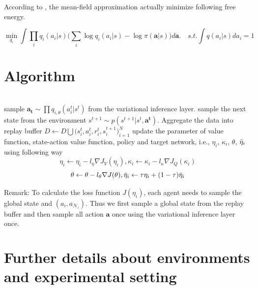 \documentclass[11pt,a4paper]{article}
\theoremstyle{definition}
\begin{document}
According to \cite{wainwright2008graphical}, the mean-field approximation actually minimize following free energy.


\begin{equation}
\min_{q_i}\int \prod_i q_i(a_i|s) \big( \sum_i \log q_i(a_i|s) - \log \pi(\mathbf{a}|s) \big) d\mathbf{a}.\quad s.t. \int q(a_i|s) da_i = 1
\end{equation}



\section{Algorithm}\label{section:algorithm}


\begin{algorithm}[h]
	\caption{variational policy propagation}\label{alg:IP}
	\begin{algorithmic}
		 \\
		\STATE sample $\mathbf{a_t}\sim \prod q_{i,\theta}(a_i^t|s^t)$ from the  variational inference  layer.
		sample the next state from the environment $s^{t+1}\sim p(s^{t+1}|s^t,\mathbf{a^t})$. Aggregate the data into replay buffer $D\leftarrow D \bigcup \big( s_i^t, a_i^t, r_i^t, s_i^{t+1} \big)_{i=1}^N$ 
		\ENDFOR
		\STATE{}
		update the parameter of value function, state-action value function, policy and target network, i.e.,  $\eta_i$, $\kappa_i$, $\theta$, $\Bar{\eta}_i$ using following way
		$$\eta_i\leftarrow\eta_i-l_\eta\nabla J_V(\eta_i),\kappa_i\leftarrow\kappa_i-l_\kappa\nabla J_Q(\kappa_i) $$
		$$\theta\leftarrow\theta-l_\theta\nabla J(\theta),\Bar{\eta}_i\leftarrow\tau \eta_i+(1-\tau)\Bar{\eta}_i$$
		\ENDFOR
		\ENDFOR
	\end{algorithmic}
\end{algorithm}


Remark: To calculate the loss function $J(\eta_i)$, each agent needs to sample the global state and $(a_i,a_{\mathcal{N}_i})$. Thus we first sample a global state from the replay buffer and then sample all action $\mathbf{a}$ once using the variational inference layer once.





\section{Further details about environments and experimental setting}
\label{app:env}
\end{document}
